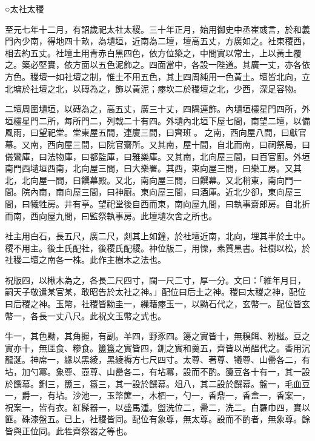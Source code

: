 
\begin{pinyinscope}

 ○太社太稷



 至元七年十二月，有詔歲祀太社太稷。三十年正月，始用御史中丞崔彧言，於和義門內少南，得地四十畝，為壝垣，近南為二壇，壇高五丈，方廣如之。社東稷西，相去約五丈。社壇土用青赤白黑四色，依方位築之，中間實以常土，上以黃土覆之。築必堅實，依方面以五色泥飾之。四面當中，各設一陛道。其廣一丈，亦各依方色。稷壇一如社壇之制，惟土不用五色，其上四周純用一色黃土。壇皆北向，立北墉於社壇之北，以磚為之，飾以黃泥；瘞坎二於稷壇之北，少西，深足容物。



 二壇周圍壝垣，以磚為之，高五丈，廣三十丈，四隅連飾。內壝垣欞星門四所，外垣欞星門二所，每所門二，列戟二十有四。外壝內北垣下屋七間，南望二壇，以備風雨，曰望祀堂。堂東屋五間，連廈三間，曰齊班。之南，西向屋八間，曰獻官幕。又南，西向屋三間，曰院官齋所。又其南，屋十間，自北而南，曰祠祭局，曰儀鸞庫，曰法物庫，曰都監庫，曰雅樂庫。又其南，北向屋三間，曰百官廚。外垣南門西壝垣西南，北向屋三間，曰大樂署。其西，東向屋三間，曰樂工房。又其北，北向屋一間，曰饌幕殿。又北，南向屋三間，曰饌幕。又北稍東，南向門一間。院內南，南向屋三間，曰神廚。東向屋三間，曰酒庫。近北少卻，東向屋三間，曰犧牲房。井有亭。望祀堂後自西而東，南向屋九間，曰執事齋郎房。自北折而南，西向屋九間，曰監祭執事房。此壇壝次舍之所也。



 社主用白石，長五尺，廣二尺，剡其上如鐘，於社壇近南，北向，埋其半於土中。稷不用主。後土氏配社，後稷氏配稷。神位版二，用慄，素質黑書。社樹以松，於社稷二壇之南各一株。此作主樹木之法也。



 祝版四，以楸木為之，各長二尺四寸，闊一尺二寸，厚一分。文曰：「維年月日，嗣天子敬遣某官某，敢昭告於太社之神。」配位曰后土之神。稷曰太稷之神，配位曰后稷之神。玉幣，社稷皆黝圭一，繅藉瘞玉一，以黝石代之，玄幣一。配位皆玄幣一，各長一丈八尺。此祝文玉幣之式也。



 牛一，其色黝，其角握，有副。羊四，野豕四。籩之實皆十，無糗餌、粉糍。豆之實亦十，無厓食、糝食。簠簋之實皆四，鉶之實和羹五，齊皆以尚醖代之。香用沉龍涎。神席一，緣以黑綾，黑綾褥方七尺四寸。太尊、著尊、犧尊、山罍各二，有坫，加勺冪。象尊、壺尊、山罍各二，有坫冪，設而不酌。籩豆各十有一，其一設於饌幕。鉶三，簠三，簋三，其一設於饌幕。俎八，其二設於饌幕。盤一，毛血豆一，爵一，有坫。沙池一，玉幣篚一，木柶一，勺一，香鼎一，香盒一，香案一，祝案一，皆有衣。紅髹器一，以盛馬湩。盥洗位二，罍二，洗二。白羅巾四，實以篚。硃漆盤五。已上，社稷皆同。配位有象尊，無太尊。設而不酌者，無象尊。餘皆與正位同。此牲齊祭器之等也。




\end{pinyinscope}
